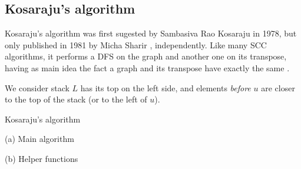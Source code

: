 \subsection{Kosaraju's algorithm} \label{algorithm-scc-kosaraju}
Kosaraju's algorithm was first sugested by Sambasiva Rao Kosaraju in 1978, but only published in 1981 by Micha Sharir \cite{sharir81}, independently. Like many \acrshort{SCC} algorithms, it performs a \acrshort{DFS} on the graph and another one on its transpose, having as main idea the fact a graph and its transpose have exactly the same .\par
We consider stack $L$ has its top on the left side, and elements \emph{before} $u$ are closer to the top of the stack (or to the left of $u$).
\begin{algorithm}
    \caption{Kosaraju's algorithm}
    \label{alg-kosaraju}
    \begin{minipage}[t]{0.49\textwidth}
        (a) Main algorithm
        \begin{algorithmic}[1]
             {}
            \EndFor
                \State {}
            \EndWhile
            \State {}
            \EndFunction
        \end{algorithmic}
    \end{minipage}
    \begin{minipage}[t]{0.49\textwidth}
        (b) Helper functions
        \begin{algorithmic}[1]
                 {\Return{}}
                \EndIf
                 {}
                \EndFor
            \EndFunction


                 {\Return{}}
                \EndIf
                \For{$v : Adj[u]]$} {}
                \EndFor
            \EndFunction
        \end{algorithmic}
    \end{minipage}
\end{algorithm}
